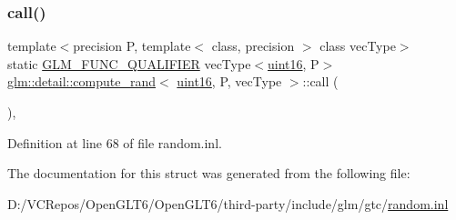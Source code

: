 \subsubsection{\texorpdfstring{call()}{call()}}
{\footnotesize\ttfamily template$<$precision P, template$<$ class, precision $>$ class vec\+Type$>$ \\
static \mbox{\hyperlink{setup_8hpp_a33fdea6f91c5f834105f7415e2a64407}{G\+L\+M\+\_\+\+F\+U\+N\+C\+\_\+\+Q\+U\+A\+L\+I\+F\+I\+ER}} vec\+Type$<$\mbox{\hyperlink{namespaceglm_1_1detail_a47b2a7d006d187338e8031a352d1ce56}{uint16}}, P$>$ \mbox{\hyperlink{structglm_1_1detail_1_1compute__rand}{glm\+::detail\+::compute\+\_\+rand}}$<$ \mbox{\hyperlink{namespaceglm_1_1detail_a47b2a7d006d187338e8031a352d1ce56}{uint16}}, P, vec\+Type $>$\+::call (\begin{DoxyParamCaption}{ }\end{DoxyParamCaption})\hspace{0.3cm}{\ttfamily [inline]}, {\ttfamily [static]}}



Definition at line 68 of file random.\+inl.



The documentation for this struct was generated from the following file\+:\begin{DoxyCompactItemize}
\item 
D\+:/\+V\+C\+Repos/\+Open\+G\+L\+T6/\+Open\+G\+L\+T6/third-\/party/include/glm/gtc/\mbox{\hyperlink{random_8inl}{random.\+inl}}\end{DoxyCompactItemize}
